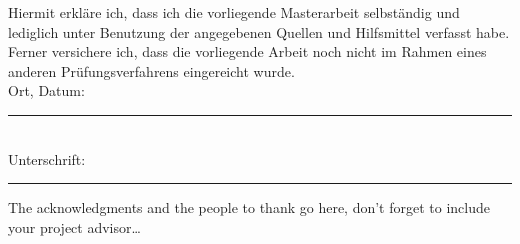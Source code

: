 \documentclass[
11pt, %
english, %
singlespacing, %
headsepline, %
consistentlayout, %
]{MastersDoctoralThesis} %
\begin{document}
\printbibliography[heading=bibintoc]




\begin{declaration}
	\addchaptertocentry{\authorshipname} %

Hiermit erkläre ich, dass ich die vorliegende Masterarbeit selbständig und lediglich unter Benutzung der angegebenen Quellen und Hilfsmittel verfasst habe. Ferner versichere ich, dass die vorliegende Arbeit noch nicht im Rahmen eines anderen Prüfungsverfahrens eingereicht wurde. \\[1cm]
	
	\noindent Ort, Datum:\\
	\rule[0.5em]{25em}{0.5pt} %
	\\[0.5cm]
	\noindent Unterschrift:\\
	\rule[0.5em]{25em}{0.5pt} %
\end{declaration}



\begin{acknowledgements}
	\addchaptertocentry{\acknowledgementname} %
	The acknowledgments and the people to thank go here, don't forget to include your project advisor\ldots
\end{acknowledgements}
\end{document}
